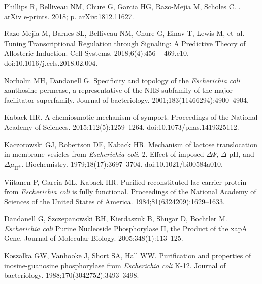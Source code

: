 \documentclass[10pt,letterpaper]{article}
\begin{document}
\begin{thebibliography}{10}
	
	{Phillips} R, {Belliveau} NM, {Chure} G, {Garcia} HG, {Razo-Mejia} M, {Scholes}
	C.
	.
	\newblock arXiv e-prints. 2018; p. arXiv:1812.11627.
	
	Razo-Mejia M, Barnes SL, Belliveau NM, Chure G, Einav T, Lewis M, et~al.
	\newblock Tuning Transcriptional Regulation through Signaling: A Predictive
	Theory of Allosteric Induction.
	\newblock Cell Systems. 2018;6(4):456 -- 469.e10.
	\newblock doi:{10.1016/j.cels.2018.02.004}.
	
	Norholm MH, Dandanell G.
	\newblock Specificity and topology of the \emph{Escherichia coli} xanthosine
	permease, a representative of the NHS subfamily of the major facilitator
	superfamily.
	\newblock Journal of bacteriology. 2001;183(11466294):4900--4904.
	
	Kaback HR.
	\newblock A chemiosmotic mechanism of symport.
	\newblock Proceedings of the National Academy of Sciences.
	2015;112(5):1259--1264.
	\newblock doi:{10.1073/pnas.1419325112}.
	
	Kaczorowski GJ, Robertson DE, Kaback HR.
	\newblock Mechanism of lactose translocation in membrane vesicles from
	\emph{Escherichia coli}. 2. Effect of imposed $\Delta \Psi$, $\Delta$ pH, and
	$\Delta \mu_{\mathrm{H^+}}$.
	\newblock Biochemistry. 1979;18(17):3697--3704.
	\newblock doi:{10.1021/bi00584a010}.
	
	Viitanen P, Garcia ML, Kaback HR.
	\newblock Purified reconstituted lac carrier protein from \emph{Escherichia
		coli} is fully functional.
	\newblock Proceedings of the National Academy of Sciences of the United States
	of America. 1984;81(6324209):1629--1633.
	
	Dandanell G, Szczepanowski RH, Kierdaszuk B, Shugar D, Bochtler M.
	\newblock \emph{Escherichia coli} Purine Nucleoside Phosphorylase II, the
	Product of the xapA Gene.
	\newblock Journal of Molecular Biology. 2005;348(1):113--125.
	
	Koszalka GW, Vanhooke J, Short SA, Hall WW.
	\newblock Purification and properties of inosine-guanosine phosphorylase from
	\emph{Escherichia coli} K-12.
	\newblock Journal of bacteriology. 1988;170(3042752):3493--3498.
	

\end{thebibliography}
\end{document}
